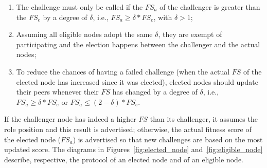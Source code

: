 \begin{enumerate}

\item The challenge must only be called if the $FS_a$ of the challenger is greater than the $FS_e$ by a degree of $\delta$, i.e., $FS_a \ge \delta * FS_e$, with $\delta > 1$;

\item Assuming all eligible nodes adopt the same $\delta$, they are exempt of participating and the election happens between the challenger and the actual nodes;

\item To reduce the chances of having a failed challenge (when the actual $FS$ of the elected node has increased since it was elected), elected nodes should update their peers whenever their $FS$ has changed by a degree of $\delta$, i.e., $FS_a \ge \delta * FS_e$ or $FS_a \le (2 - \delta) * FS_e$.

\end{enumerate}

If the challenger node has indeed a higher $FS$ than its challenger, it assumes the role position and this result is advertised; otherwise, the actual fitness score of the elected node ($FS_a$) is advertised so that new challenges are based on the most updated score. The diagrams in Figures~\ref{fig:elected_node} and~\ref{fig:eligible_node} describe, respective, the protocol of an elected node and of an eligible node.
